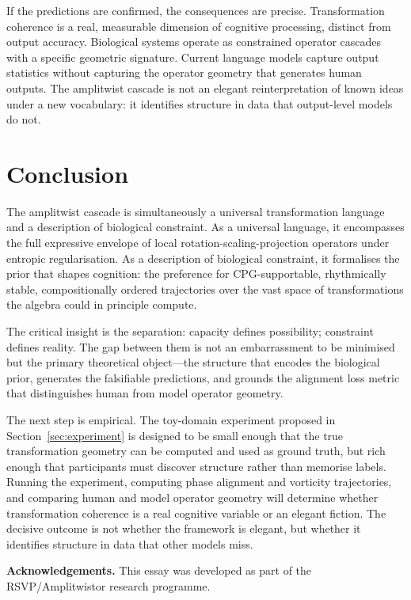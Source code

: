 \documentclass[12pt, a4paper]{article}
\theoremstyle{remark}
\theoremstyle{definition}
\begin{document}
If the predictions are confirmed, the consequences are precise.  Transformation coherence
is a real, measurable dimension of cognitive processing, distinct from output accuracy.
Biological systems operate as constrained operator cascades with a specific geometric
signature.  Current language models capture output statistics without capturing the
operator geometry that generates human outputs.  The amplitwist cascade is not an elegant
reinterpretation of known ideas under a new vocabulary: it identifies structure in data
that output-level models do not.

\section{Conclusion}
\label{sec:conclusion}

The amplitwist cascade is simultaneously a universal transformation language and a
description of biological constraint.  As a universal language, it encompasses the full
expressive envelope of local rotation-scaling-projection operators under entropic
regularisation.  As a description of biological constraint, it formalises the prior that
shapes cognition: the preference for CPG-supportable, rhythmically stable, compositionally
ordered trajectories over the vast space of transformations the algebra could in principle
compute.

The critical insight is the separation: capacity defines possibility; constraint defines
reality.  The gap between them is not an embarrassment to be minimised but the primary
theoretical object---the structure that encodes the biological prior, generates the
falsifiable predictions, and grounds the alignment loss metric that distinguishes human from
model operator geometry.

The next step is empirical.  The toy-domain experiment proposed in
Section~\ref{sec:experiment} is designed to be small enough that the true transformation
geometry can be computed and used as ground truth, but rich enough that participants must
discover structure rather than memorise labels.  Running the experiment, computing phase
alignment and vorticity trajectories, and comparing human and model operator geometry will
determine whether transformation coherence is a real cognitive variable or an elegant
fiction.  The decisive outcome is not whether the framework is elegant, but whether it
identifies structure in data that other models miss.

\bigskip
\noindent\textbf{Acknowledgements.}\quad
This essay was developed as part of the RSVP\slash Amplitwistor research programme.
\end{document}
